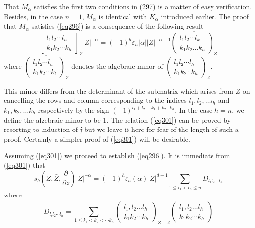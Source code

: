 That $M_\alpha$ satisfies the first two conditions in (297) is a
matter of easy verification. Besides, in the case $n =1$, $M_\alpha$ is
identical with $K_\alpha$ introduced earlier. The proof that
$M_\alpha$ satisfies (\ref{eq296}) is a consequence of the following result 
\begin{equation*}
\begin{bmatrix} l_1 l_2 \cdots l_h \\ k_1 k_2 \cdots
  k_h \end{bmatrix}_Z |Z|^{- \alpha} = (-1)^{h} \varepsilon_h |\alpha|
|Z|^{- \alpha -1} \overline{\begin{pmatrix} l_1 l_2 \cdots l_k \\ k_1
    k_2 \ldots k_h \end{pmatrix}_Z} \tag{301}\label{eq301}      
\end{equation*}\pageoriginale
where $\overline{ \begin{pmatrix} l_1 l_2 \cdots l_h \\ k_1 k_2 \cdots
    k_l   \end{pmatrix}_Z}$ denotes the algebraic minor of
$\begin{pmatrix} l_1 l_2 \cdots l_h \\ k_1 k_2 \cdot
  k_h \end{pmatrix}_Z$. 

This minor differs from the determinant of the submatrix which arises
from $Z$ on cancelling the rows and column corresponding to the
indices \; $l_1, l_2 , \ldots l_h$ \; and \; $k_1, k_2, \ldots k_h$
\; respectively by the sign \break $(-1)^{l_1 + l_2 + k_1 + k_2 \cdots
  k_h}$. In the case $h = n$, we define the algebraic minor to be
1. The relation (\ref{eq301}) can be proved by resorting to induction of
$\mathfrak{f}$ but we leave it here for fear of the length of such a
proof. Certainly a simpler proof of (\ref{eq301}) will be desirable. 

Assuming (\ref{eq301}) we proceed to establish (\ref{eq296}). It is
immediate from (\ref{eq301}) that  
$$
s_h (Z, \bar{Z}, \frac{\partial}{\partial z}) |Z|^{- \alpha} =
(-1)^{h} \varepsilon_h (\alpha) |Z|^{d - 1} \sum_{1 \le i_1 < l_h \le
  n} D_{l_1 l_2 \ldots l_h} 
$$
where
$$
D_{l_i l_2 \cdots l_h} = \sum_{1 \le k_1 < k_2 < \cdots
  k_h} \begin{pmatrix} l_1, l_2 \ldots l_h\\ k_1 k_2 \cdots
  k_h \end{pmatrix}_{Z - \bar{Z}} \overline{ \begin{pmatrix} l_1, l_2
    \ldots l_h\\ k_1 k_2 \cdots k_h \end{pmatrix}} 
$$


